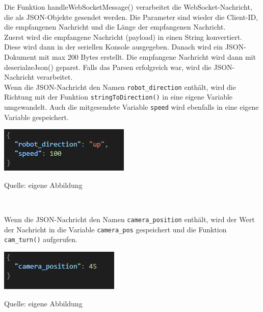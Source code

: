 \documentclass[ngerman,12pt,a4paper]{article}
\begin{document}
	Die Funktion handleWebSocketMessage() verarbeitet die WebSocket-Nachricht, die als JSON-Objekte gesendet werden. Die Parameter sind wieder die Client-ID, die empfangenen Nachricht und die Länge der empfangenen Nachricht. \\[0.5cm]
	Zuerst wird die empfangene Nachricht (payload) in einen String konvertiert. Diese wird dann in der seriellen Konsole ausgegeben. Danach wird ein JSON-Dokument mit max 200 Bytes erstellt. Die empfangene Nachricht wird dann mit deserialzeJson() geparst. Falls das Parsen erfolgreich war, wird die JSON-Nachricht verarbeitet. \\[0.5cm]
	Wenn die JSON-Nachricht den Namen \texttt{robot\_direction} enthält, wird die Richtung mit der Funktion \texttt{stringToDirection()} in eine eigene Variable umgewandelt. Auch die mitgesendete Variable \texttt{speed} wird ebenfalls in eine eigene Variable gespeichert. 
	\begin{center}
		\begin{minipage}[t]{0.4\textwidth}
			\includegraphics{Pictures/example-navigate}
			\label{fig:example-speed}
			\vspace{-10pt}
			\begin{center}
				\par\small Quelle: eigene Abbildung 
			\end{center}
		\end{minipage} \\[0.75cm]
	\end{center}
	Wenn die JSON-Nachricht den Namen \texttt{camera\_position} enthält, wird der Wert der Nachricht in die Variable \texttt{camera\_pos} gespeichert und die Funktion \texttt{cam\_turn()}  aufgerufen. 
	\begin{center}
		\begin{minipage}[t]{0.4\textwidth}
			\includegraphics{Pictures/example-camera}
			\label{fig:example-camera}
			\vspace{-10pt}
			\begin{center}
				\par\small Quelle: eigene Abbildung 
			\end{center}
		\end{minipage} \\[0.75cm]
	\end{center}
\end{document}
